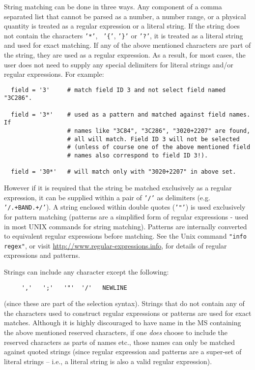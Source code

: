 String matching can be done in three ways. Any component of a comma
separated list that cannot be parsed as a number, a number range, or
a physical quantity is treated as a regular expression or a literal
string. If the string does not contain the characters {\tt '*'}, {\tt
'\{'}, {\tt '\}'} or {\tt '?'}, it is treated as a literal string and
used for exact matching. If any of the above mentioned characters are
part of the string, they are used as a regular expression. As a result,
for most cases, the user does not need to supply any special
delimiters for literal strings and/or regular expressions.  For
example:
\small
\begin{verbatim}
  field = '3'     # match field ID 3 and not select field named "3C286".

  field = '3*'    # used as a pattern and matched against field names. If
                  # names like "3C84", "3C286", "3020+2207" are found,
                  # all will match. Field ID 3 will not be selected
                  # (unless of course one of the above mentioned field
                  # names also correspond to field ID 3!). 

  field = '30*'   # will match only with "3020+2207" in above set. 
\end{verbatim}
\normalsize
However if it is required that the string be matched exclusively as a
regular expression, it can be supplied within a pair of {\tt '/'} as
delimiters (e.g. {\tt '/.+BAND.+/'}). A string enclosed within double
quotes ({\tt '"'}) is used exclusively for pattern matching (patterns
are a simplified form of regular expressions - used in most UNIX
commands for string matching). Patterns are internally converted to
equivalent regular expressions before matching. See the
Unix command {\tt "info regex"}, or visit
\url{http://www.regular-expressions.info}, for details of regular
expressions and patterns.

Strings can include any character except the following:
\small
\begin{verbatim}
     ','   ';'   '"'  '/'   NEWLINE
\end{verbatim}
\normalsize
(since these are part of the selection syntax).  
Strings that do not contain any of the characters used to construct
regular expressions or patterns are used for exact matches. Although
it is highly discouraged to have name in the MS containing the above
mentioned reserved characters, if one {\it does} choose to include the
reserved characters as parts of names etc., those names can only be
matched against quoted strings (since regular expression and patterns
are a super-set of literal strings -- i.e., a literal string is also a valid
regular expression). 

